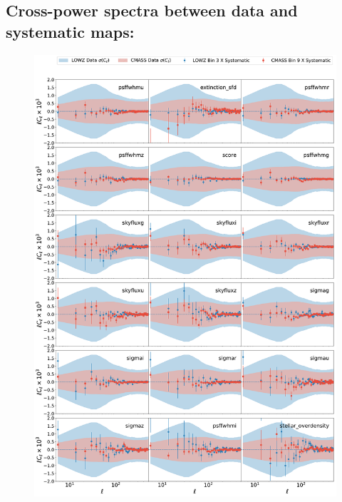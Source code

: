 \subsection{Cross-power spectra between data and systematic maps:}\label{Sec:SystCls}
\begin{figure}
\begin{center}
\includegraphics[scale=0.30]{BOSS-FIGS/systematics_CMASS_Bin3_LOWZ_Bin3.pdf}

\end{center}
\end{figure}
